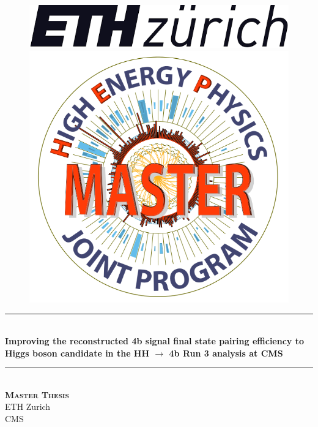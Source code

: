 \documentclass[11pt]{article}
\numberwithin{figure}{section}  %
\numberwithin{table}{section}   %
\numberwithin{equation}{section} %
\begin{document}
\begin{titlepage}
\newcommand{\HRule}{\rule{\linewidth}{0.5mm}}
\begin{figure}[H]
\noindent
\begin{minipage}{.5\textwidth}
\begin{flushleft}
    \includegraphics[scale=0.15]{Logos/Unknown.png}
\end{flushleft}
\end{minipage}
\begin{minipage}{.5\textwidth}
\begin{flushright}
\includegraphics[scale=0.2]{Logos/logo_hep_centre_texte_coupe.png}
\end{flushright}
\end{minipage}

\end{figure}
\center
\HRule \\[0.4cm]
{ \huge \bfseries  Improving the reconstructed 4b signal final state pairing efficiency to Higgs boson candidate in the HH $\to$ 4b Run 3 analysis at CMS
 \\[0.15cm] }
 \HRule \\[0.5cm]
 \center 
\textsc{\LARGE\textbf{Master Thesis}}\\[1cm]
{\Large ETH Zurich}\\[0.5cm]
{\Large CMS}\\[1cm]


\end{titlepage}
\end{document}
